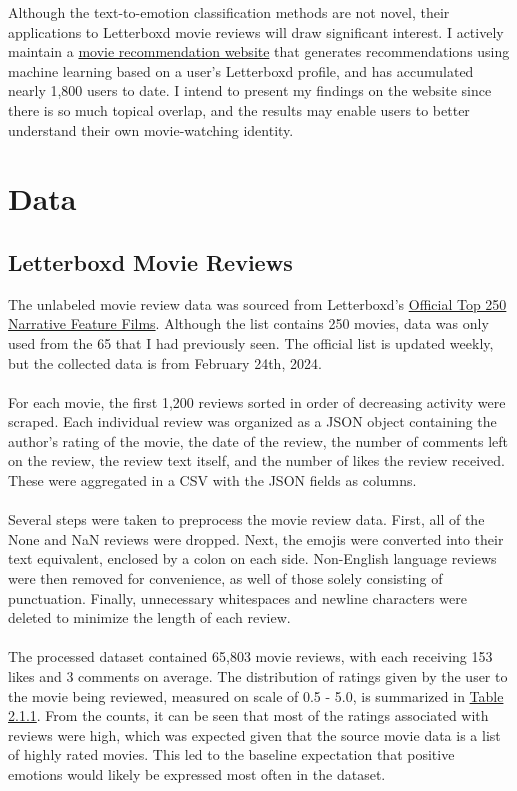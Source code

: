 \documentclass[11pt]{article}
\begin{document}
Although the text-to-emotion classification methods are not novel, their applications to Letterboxd movie reviews will draw significant interest. I actively maintain a \href{https://www.recommendations.victorverma.com/}{movie recommendation website} that generates recommendations using machine learning based on a user's Letterboxd profile, and has accumulated nearly 1,800 users to date. I intend to present my findings on the website since there is so much topical overlap, and the results may enable users to better understand their own movie-watching identity.

\section{Data}
\subsection{Letterboxd Movie Reviews}
The unlabeled movie review data was sourced from Letterboxd's \href{https://letterboxd.com/dave/list/official-top-250-narrative-feature-films/}{Official Top 250 Narrative Feature Films}. Although the list contains 250 movies, data was only used from the 65 that I had previously seen. The official list is updated weekly, but the collected data is from February 24th, 2024. \\ \\
For each movie, the first 1,200 reviews sorted in order of decreasing activity were scraped. Each individual review was organized as a JSON object containing the author's rating of the movie, the date of the review, the number of comments left on the review, the review text itself, and the number of likes the review received. These were aggregated in a CSV with the JSON fields as columns. \\ \\
Several steps were taken to preprocess the movie review data. First, all of the None and NaN reviews were dropped. Next, the emojis were converted into their text equivalent, enclosed by a colon on each side. Non-English language reviews were then removed for convenience, as well of those solely consisting of punctuation. Finally, unnecessary whitespaces and newline characters were deleted to minimize the length of each review. \\ \\
The processed dataset contained 65,803 movie reviews, with each receiving 153 likes and 3 comments on average. The distribution of ratings given by the user to the movie being reviewed, measured on scale of 0.5 - 5.0, is summarized in \hyperref[tab:review_rating_distribution]{Table 2.1.1}. From the counts, it can be seen that most of the ratings associated with reviews were high, which was expected given that the source movie data is a list of highly rated movies. This led to the baseline expectation that positive emotions would likely be expressed most often in the dataset.
\end{document}
